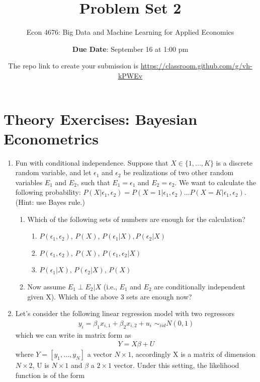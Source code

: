 \documentclass[12pt,onecolumn]{article}
\title{Problem Set 2}
\subtitle{Econ 4676: Big Data and Machine Learning for Applied Economics}
\author{{\bf Due Date}: September 16 at 1:00 pm}
\date{}
\date{The repo link to create your submission is \url{https://classroom.github.com/g/vh-kPWEv}}
\begin{document}
\maketitle

\section{Theory Exercises: Bayesian Econometrics}

\begin{enumerate}

\item Fun with conditional independence.  Suppose that $X\in \{1,...,K\} $ is a discrete random variable, and let $\epsilon_1$ and $\epsilon_2$ be realizations of two other random variables $E_1$ and $E_2$, such that $E_1=\epsilon_1$ and $E_2=\epsilon_2$. We want to calculate the following probability: $P(X|\epsilon_1,\epsilon_2)= P(X=1|\epsilon_1,\epsilon_2)\dots  P(X=K|\epsilon_1,\epsilon_2)$. (Hint: use Bayes rule.)
  \begin{enumerate}
  \item Which of the following sets of numbers are enough for the calculation?
  \begin{enumerate}
    \item $P(\epsilon_1,\epsilon_2)$, $P(X)$, $P(\epsilon_1|X), P(\epsilon_2|X)$
    \item $P(\epsilon_1,\epsilon_2)$, $P(X)$, $P(\epsilon_1,\epsilon_2|X)$ 
    \item $P(\epsilon_1|X)$, $P(\epsilon_2|X)$, $P(X)$
    \end{enumerate}
    \item Now  assume $E_1 \perp E_2|X$ (i.e., $E_1$ and $E_2$ are conditionally independent given X). Which of the above 3 sets are enough now?
  \end{enumerate}



  \item Let's consider the following linear regression model with two regressors 
  \begin{align}\label{eq:model}
  y_i = \beta_1 x_{i,1} +\beta_2 x_{i,2} + u_i \,\, \sim_{iid} N(0,1)
  \end{align}
  which we can write in matrix form as 
  \begin{align}
  Y= X\beta + U
  \end{align}
  where $Y=[y_1,\dots,y_N]$ a vector $N\times1$, accordingly X is a matrix of dimension $N\times2$, U is $N\times1$ and $\beta$ a $2\times1$ vector. Under this setting, the likelihood function is of the form
  

\end{enumerate}
\end{document}
